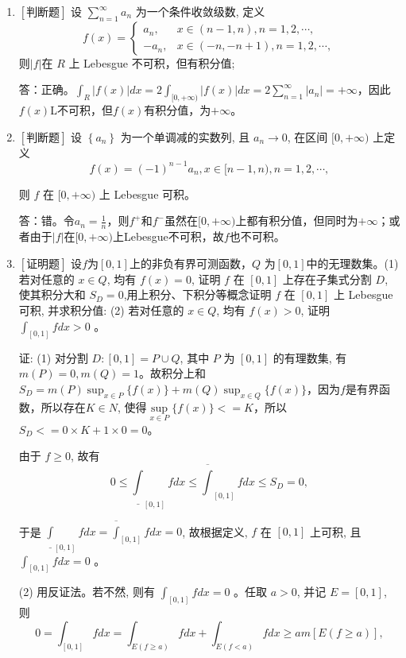 \documentclass{article}
\begin{document}
\begin{enumerate}
    \item $\left[\textbf{判断题}\right]$ 设 $\sum_{n=1}^{\infty} a_n$ 为一个条件收敛级数, 定义
    $$
    f(x)=\left\{\begin{array}{lc}
    a_n, & x \in(n-1, n), n=1,2, \cdots, \\
    -a_n, & x \in(-n,-n+1), n=1,2, \cdots,
    \end{array}\right.
    $$
    则$\left|f\right|$在 $R$ 上 Lebesgue 不可积，但有积分值;

    答：正确。$\int_{R} |f(x)| dx=2\int_{[0, +\infty)} |f(x)| dx=2\sum_{n=1}^{\infty} |a_n|=+\infty$，因此$f(x)$L不可积，但$f(x)$有积分值，为$+\infty$。

    \item $\left[\textbf{判断题}\right]$ 设 $\left\{a_n\right\}$ 为一个单调减的实数列, 且 $a_n \rightarrow 0$, 在区间 $[0,+\infty)$ 上定义
    $$
    f(x)=(-1)^{n-1} a_n, x \in[n-1, n), n=1,2, \cdots,
    $$

则 $f$ 在 $[0,+\infty)$ 上 Lebesgue 可积。

答：错。令$a_n=\frac{1}{n}$，则$f^{+}$和$f^{-}$虽然在$[0, +\infty)$上都有积分值，但同时为$+\infty$；或者由于$|f|$在$[0, +\infty)$上Lebesgue不可积，故$f$也不可积。
    
    \item \label{proof1} $\left[\textbf{证明题}\right]$ 设$f$为$[0, 1]$上的非负有界可测函数，$Q$ 为$[0,1]$中的无理数集。(1) 若对任意的 $x \in Q$, 均有 $f(x)=0$, 证明 $f$ 在 $[0,1]$ 上存在子集式分割 $D$, 使其积分大和 $S_D=0$,用上积分、下积分等概念证明 $f$ 在 $[0,1]$ 上 Lebesgue 可积, 并求积分值: (2) 若对任意的 $x \in Q$, 均有 $f(x)>0$, 证明 $\int_{[0,1]} f d x>0$ 。
    
证: (1) 对分割 $D:[0,1]=P \cup Q$, 其中 $P$ 为 $[0,1]$ 的有理数集, 有 $m(P)=0, m(Q)=1$。故积分上和$S_D=m(P)\sup_{x\in P} \{f(x)\} + m(Q)\sup_{x\in Q} \{f(x)\}$，因为$f$是有界函数，所以存在$K \in N$, 使得$\mathop{sup}\limits_{x\in P} \{f(x)\} <= K$，所以$S_D <= 0\times K + 1\times 0 = 0$。

由于 $f \geq 0$, 故有
$$
0 \leq \underline{\int}_{[0,1]} f d x \leq \overline{\int}_{[0,1]} f d x \leq S_D=0,
$$

于是 $\underline{\int}_{[0,1]} f d x=\overline{\int}_{[0,1]} f d x=0$, 故根据定义, $f$ 在 $[0,1]$ 上可积, 且 $\int_{[0,1]} f d x=0$ 。

(2) 用反证法。若不然, 则有 $\int_{[0,1]} f d x=0$ 。任取 $a>0$, 并记 $E=[0,1]$, 则
$$
0=\int_{[0,1]} f d x=\int_{E(f\geq a)} f d x+\int_{E(f<a)} f d x \geq a m[E(f \geq a)], 
$$


\end{enumerate}
\end{document}
